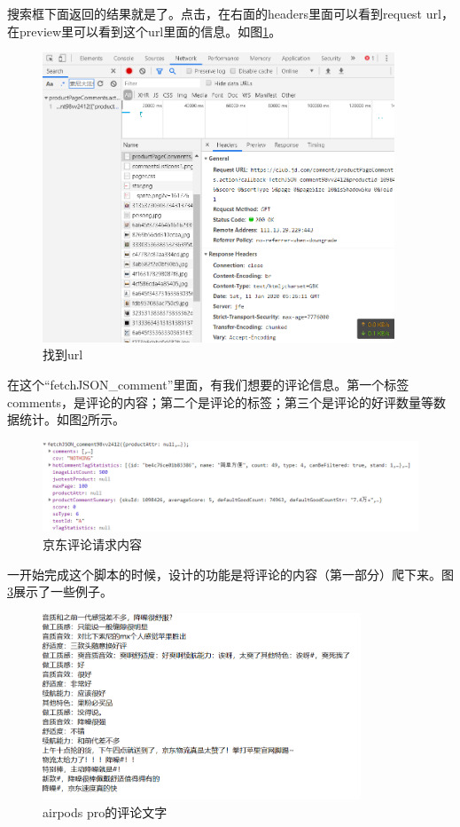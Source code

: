 搜索框下面返回的结果就是了。点击，在右面的headers里面可以看到request url，在preview里可以看到这个url里面的信息。如图\ref{img:yhb4}。
\begin{figure}[htbp]
\centering
\includegraphics[width=10.5cm]{img/yhb/find_url_jd.png}
\caption{找到url} %
\label{img:yhb4}   %
\end{figure}

在这个“fetchJSON\_comment”里面，有我们想要的评论信息。第一个标签comments，是评论的内容；第二个是评论的标签；第三个是评论的好评数量等数据统计。如图\ref{img:yhb5}所示。

\begin{figure}[htbp]
\centering
\includegraphics[width=13.5cm]{img/yhb/json_items_jd.png}
\caption{京东评论请求内容}
\label{img:yhb5}   %
\end{figure}



一开始完成这个脚本的时候，设计的功能是将评论的内容（第一部分）爬下来。图\ref{img:yhb6}展示了一些例子。
\begin{figure}[htbp]
\centering
\includegraphics[width=9.5cm]{img/yhb/cmt_contents_eg_jd.png}
\caption{airpods pro的评论文字} %
\label{img:yhb6}   %
\end{figure}

